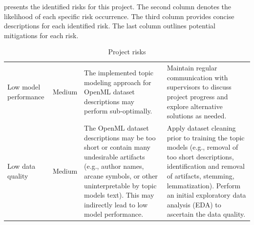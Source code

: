 \documentclass{article}
\begin{document}
 presents the identified risks for this project. The second column denotes the likelihood of each specific risk occurrence. The third column provides concise descriptions for each identified risk. The last column outlines potential mitigations for each risk.

\begin{table}[h!]
    \centering
    \captionsetup{skip=5pt}
    \caption{Project risks}
    \label{table:project-risks}
    \renewcommand{\arraystretch}{1.5} %
    \begin{tabularx}{\textwidth} {
        | >{\raggedright\arraybackslash}m{} |
        >{\raggedright\arraybackslash}m{} |
        >{\raggedright\arraybackslash}m{} |
        >{\raggedright\arraybackslash}m{} |}
        \hline
        \rowcolor{lightblue}
        \multicolumn{1}{|c|}{\textbf{Risk label}} & \multicolumn{1}{c|}{\textbf{Likelihood}} & \multicolumn{1}{c|}{\textbf{Risk description}}                                                                                                                                                                                 & \multicolumn{1}{c|}{\textbf{Risk mitigation}}                                                                                                                                                                                                                                                                                                               \\
        \hline
        Low model performance                     & \cellcolor{lightyellow} Medium           & The implemented topic modeling approach for OpenML dataset descriptions may perform sub-optimally.                                                                                                                             & Maintain regular communication with supervisors to discuss project progress and explore alternative solutions as needed.                                                                                                                                                                                                                                    \\
        \hline
        Low data quality                          & \cellcolor{lightyellow} Medium           & The OpenML dataset descriptions may be too short or contain many undesirable artifacts (e.g., author names, arcane symbols, or other uninterpretable by topic models text). This may indirectly lead to low model performance. & Apply dataset cleaning prior to training the topic models (e.g., removal of too short descriptions, identification and removal of artifacts, stemming, lemmatization). Perform an initial exploratory data analysis (EDA) to ascertain the data quality.                                                                                                    \\

\end{tabularx}
\end{table}
\end{document}
